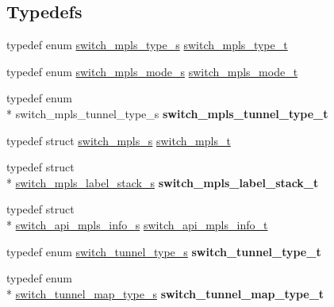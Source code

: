 \subsection*{Typedefs}
\begin{DoxyCompactItemize}
\item 
typedef enum \hyperlink{group__Tunnel_ga0604465b082bd3c18d8252cc9d50e771}{switch\+\_\+mpls\+\_\+type\+\_\+s} \hyperlink{group__Tunnel_ga9757d049be2922674f9c5350384ff3ae}{switch\+\_\+mpls\+\_\+type\+\_\+t}
\item 
typedef enum \hyperlink{group__Tunnel_ga9422139cfd73bb4e5796a35c4569d763}{switch\+\_\+mpls\+\_\+mode\+\_\+s} \hyperlink{group__Tunnel_ga31b707543626fd0d899f011a2bf91fc9}{switch\+\_\+mpls\+\_\+mode\+\_\+t}
\item 
\hypertarget{group__Tunnel_ga5812c1c4677b4d75b7ed933d03a63cff}{typedef enum \\*
switch\+\_\+mpls\+\_\+tunnel\+\_\+type\+\_\+s {\bfseries switch\+\_\+mpls\+\_\+tunnel\+\_\+type\+\_\+t}}\label{group__Tunnel_ga5812c1c4677b4d75b7ed933d03a63cff}

\item 
typedef struct \hyperlink{structswitch__mpls__s}{switch\+\_\+mpls\+\_\+s} \hyperlink{group__Tunnel_gaa1a400888248e1e756adbd37f010f288}{switch\+\_\+mpls\+\_\+t}
\item 
\hypertarget{group__Tunnel_ga2533a1ed0adc2602ec426a7e0b553c8e}{typedef struct \\*
\hyperlink{structswitch__mpls__label__stack__s}{switch\+\_\+mpls\+\_\+label\+\_\+stack\+\_\+s} {\bfseries switch\+\_\+mpls\+\_\+label\+\_\+stack\+\_\+t}}\label{group__Tunnel_ga2533a1ed0adc2602ec426a7e0b553c8e}

\item 
typedef struct \\*
\hyperlink{structswitch__api__mpls__info__s}{switch\+\_\+api\+\_\+mpls\+\_\+info\+\_\+s} \hyperlink{group__Tunnel_gab183bce9dc3bd5f8baa23b589e040674}{switch\+\_\+api\+\_\+mpls\+\_\+info\+\_\+t}
\item 
\hypertarget{group__Tunnel_gaf40098a00826b3b6bfed7ec311fa4208}{typedef enum \hyperlink{group__Tunnel_gae6e97544aa9d069ef7640927ba5f92aa}{switch\+\_\+tunnel\+\_\+type\+\_\+s} {\bfseries switch\+\_\+tunnel\+\_\+type\+\_\+t}}\label{group__Tunnel_gaf40098a00826b3b6bfed7ec311fa4208}

\item 
\hypertarget{group__Tunnel_ga1a14ad2492a83d5936040e1ffa2a4abd}{typedef enum \\*
\hyperlink{group__Tunnel_gac912a56b58661dcec8846d16be80de31}{switch\+\_\+tunnel\+\_\+map\+\_\+type\+\_\+s} {\bfseries switch\+\_\+tunnel\+\_\+map\+\_\+type\+\_\+t}}\label{group__Tunnel_ga1a14ad2492a83d5936040e1ffa2a4abd}


\end{DoxyCompactItemize}

